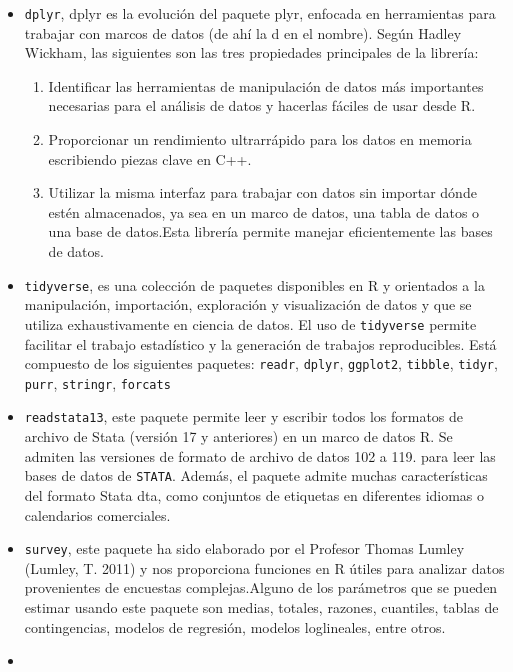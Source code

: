 \documentclass[
  12pt,
]{book}
\begin{document}
\begin{itemize}
\item
  \texttt{dplyr}, dplyr es la evolución del paquete plyr, enfocada en herramientas para trabajar con marcos de datos (de ahí la d en el nombre). Según Hadley Wickham, las siguientes son las tres propiedades principales de la librería:

  \begin{enumerate}
  \def\labelenumi{\arabic{enumi})}
  \item
    Identificar las herramientas de manipulación de datos más importantes necesarias para el análisis de datos y hacerlas fáciles de usar desde R.
  \item
    Proporcionar un rendimiento ultrarrápido para los datos en memoria escribiendo piezas clave en C++.
  \item
    Utilizar la misma interfaz para trabajar con datos sin importar dónde estén almacenados, ya sea en un marco de datos, una tabla de datos o una base de datos.Esta librería permite manejar eficientemente las bases de datos.
  \end{enumerate}
\item
  \texttt{tidyverse}, es una colección de paquetes disponibles en R y orientados a la manipulación, importación, exploración y visualización de datos y que se utiliza exhaustivamente en ciencia de datos. El uso de \texttt{tidyverse} permite facilitar el trabajo estadístico y la generación de trabajos reproducibles. Está compuesto de los siguientes paquetes: \texttt{readr}, \texttt{dplyr}, \texttt{ggplot2}, \texttt{tibble}, \texttt{tidyr}, \texttt{purr}, \texttt{stringr}, \texttt{forcats}
\item
  \texttt{readstata13}, este paquete permite leer y escribir todos los formatos de archivo de Stata (versión 17 y anteriores) en un marco de datos R. Se admiten las versiones de formato de archivo de datos 102 a 119. para leer las bases de datos de \texttt{STATA}. Además, el paquete admite muchas características del formato Stata dta, como conjuntos de etiquetas en diferentes idiomas o calendarios comerciales.
\item
  \texttt{survey}, este paquete ha sido elaborado por el Profesor Thomas Lumley (Lumley, T. 2011) y nos proporciona funciones en R útiles para analizar datos provenientes de encuestas complejas.Alguno de los parámetros que se pueden estimar usando este paquete son medias, totales, razones, cuantiles, tablas de contingencias, modelos de regresión, modelos loglineales, entre otros.
\item

\end{itemize}
\end{document}
